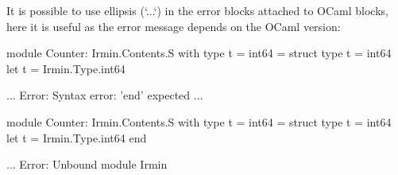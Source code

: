 It is possible to use ellipsis (`...`) in the error blocks attached to OCaml blocks, here it is useful as the error message depends on the OCaml version:

\begin{ocaml}
module Counter: Irmin.Contents.S with type t = int64 = struct
  type t = int64
  let t = Irmin.Type.int64
\end{ocaml}
\begin{mdx-error}
...
Error: Syntax error: 'end' expected
...
\end{mdx-error}

\begin{ocaml}
module Counter: Irmin.Contents.S with type t = int64 = struct
  type t = int64
  let t = Irmin.Type.int64
end
\end{ocaml}
\begin{mdx-error}
...
Error: Unbound module Irmin
\end{mdx-error}
